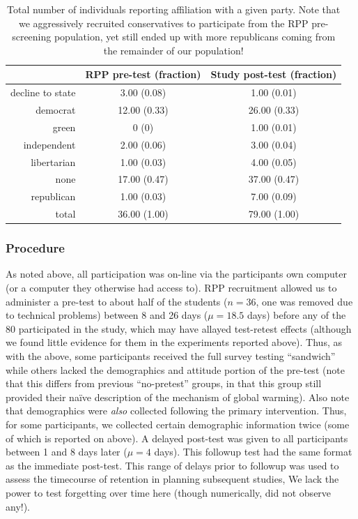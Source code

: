 \begin{table}[ht]
    \caption{Total number of individuals reporting affiliation with a given
        party. Note that we aggressively recruited conservatives to participate
        from the RPP pre-screening population, yet still ended up with more
        republicans coming from the remainder of our population!}
    \label{table:mech-rpp-party-affiliations}
\centering
\begin{tabular}{rcc}
  \toprule
 & RPP pre-test (fraction) & Study post-test (fraction) \\ 
  \midrule
  decline to state & 3.00 (0.08) & 1.00 (0.01) \\ 
  democrat & 12.00 (0.33) & 26.00 (0.33) \\ 
  green & 0 (0) & 1.00 (0.01) \\ 
  independent & 2.00 (0.06) & 3.00 (0.04) \\ 
  libertarian & 1.00 (0.03) & 4.00 (0.05) \\ 
  none & 17.00 (0.47) & 37.00 (0.47) \\ 
  republican & 1.00 (0.03) & 7.00 (0.09) \\ 
  \midrule
  total & 36.00 (1.00) & 79.00 (1.00) \\ 
   \bottomrule
\end{tabular}
\end{table}

\subsubsection{Procedure}

As noted above, all participation was on-line via the participants own computer
(or a computer they otherwise had access to). RPP recruitment allowed us to
administer a pre-test to about half of the students ($n=36$, one was removed due
to technical problems) between 8 and 26 days ($\mu=18.5$ days) before any of the
80 participated in the study, which may have allayed test-retest effects
(although we found little evidence for them in the experiments reported above).
Thus, as with the above, some participants received the full survey testing
``sandwich'' while others lacked the demographics and attitude portion of the
pre-test (note that this differs from previous “no-pretest” groups, in that this
group still provided their na\"ive description of the mechanism of global
warming). Also note that demographics were \emph{also} collected following the
primary intervention. Thus, for some participants, we collected certain
demographic information twice (some of which is reported on above).
A delayed post-test was given to all participants between 1 and 8 days later
($\mu=4$ days). This followup test had the same format as the immediate
post-test. This range of delays prior to followup was used to assess the
timecourse of retention in planning subsequent studies, We lack the power to
test forgetting over time here (though numerically, did not observe any!).


